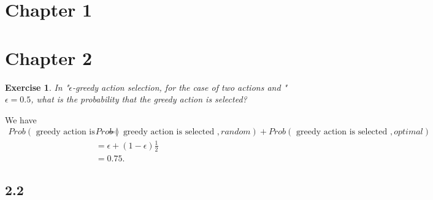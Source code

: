 \documentclass[answers]{exam}
\newtheorem{exercise}[theorem]{Exercise}
\theoremstyle{definition}
\theoremstyle{remark}
\begin{document}
\section{Chapter 1}

\section{Chapter 2}


\begin{exercise}
In "$\epsilon$-greedy action selection, for the case of two actions and " $\epsilon= 0.5$, what is
the probability that the greedy action is selected?
\end{exercise}
\begin{solution}
We have
\begin{align*}
Prob(\text{  greedy action is selected })=&Prob(\text{  greedy action is selected },random)+Prob(\text{  greedy action is selected },optimal)    \\
&=\epsilon+(1-\epsilon)\frac{1}{2}\\
&=0.75.
\end{align*}
\end{solution}

\subsection{2.2}
\end{document}
